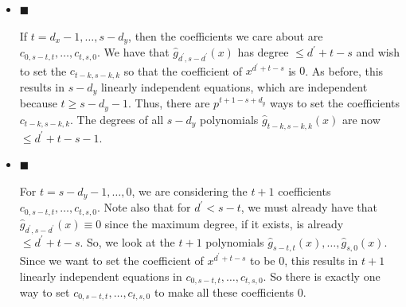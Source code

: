 \documentclass[10pt,a4paper]{article}
\begin{document}
\begin{itemize}
The next case is $t=s,\nobreak\ s-1,\nobreak\ \dots,\nobreak\ d_{x}$. In this case, we are looking at the $d_{x}+1$ coefficients $c_{0,s-t,t},\dots,c_{d_{x},s-t+d_{x},t-d_{x}}$. We have so far that all $\hat{g}_{d^{\prime},s-d^{\prime}}(x)$ have degree $\leq d^{\prime}+t-s$, and the coefficient of $x^{d^{\prime}+t-s}$ in $\hat{g}_{d^{\prime},s-d^{\prime}}(x)$ is equal to the sum of the coefficients of $x^{d^{\prime}+t-s}$ and $x^{d^{\prime}+t-s+(p-1)}$ in $g_{d^{\prime},s-d^{\prime}}(x)$. Similar to the previous case, this results in $s-d_{y}$ independent linear equations (by Lemma 33, using the fact that $t\geq s-d_{y}-1$. Thus, there are $p^{d_{x}+d_{y}+1-s}$ ways to set $c_{0,s-t,t},\dots,c_{d_{x},s-t+d_{x},t-d_{x}}$. Note that after we’ve set these coefficients, the degree of $\hat{g}_{d^{\prime},s-d^{\prime}}(x)$ necessarily must be $\leq d^{\prime}+t-s-1$ by choice of these coefficients.\par





\item[] 
$\blacksquare$ 


If $t=d_{x}-1,\dots,s-d_{y}$, then the coefficients we care about are $c_{0,s-t,t},\dots,c_{t,s,0}$. We have that $\hat{g}_{d^{\prime},s-d^{\prime}}(x)$ has degree $\leq d^{\prime}+t-s$ and wish to set the $c_{t-k,s-k,k}$ so that the coefficient of $x^{d^{\prime}+t-s}$ is $0$. As before, this results in $s-d_{y}$ linearly independent equations, which are independent because $t\geq s-d_{y}-1$. Thus, there are $p^{t+1-s+d_{y}}$ ways to set the coefficients $c_{t-k,s-k,k}$. The degrees of all $s-d_{y}$ polynomials $\hat{g}_{t-k,s-k,k}(x)$ are now $\leq d^{\prime}+t-s-1$.\par





\item[] 
$\blacksquare$ 


For $t=s-d_{y}-1,\dots,0$, we are considering the $t+1$ coefficients $c_{0,s-t,t},\dots,c_{t,s,0}$. Note also that for $d^{\prime}<s-t$, we must already have that $\hat{g}_{d^{\prime},s-d^{\prime}}(x)\equiv 0$ since the maximum degree, if it exists, is already $\leq d^{\prime}+t-s$. So, we look at the $t+1$ polynomials $\hat{g}_{s-t,t}(x),\dots,\hat{g}_{s,0}(x)$. Since we want to set the coefficient of $x^{d^{\prime}+t-s}$ to be $0$, this results in $t+1$ linearly independent equations in $c_{0,s-t,t},\dots,c_{t,s,0}$. So there is exactly one way to set $c_{0,s-t,t},\dots,c_{t,s,0}$ to make all these coefficients $0$.\par





\end{itemize}
\end{document}
